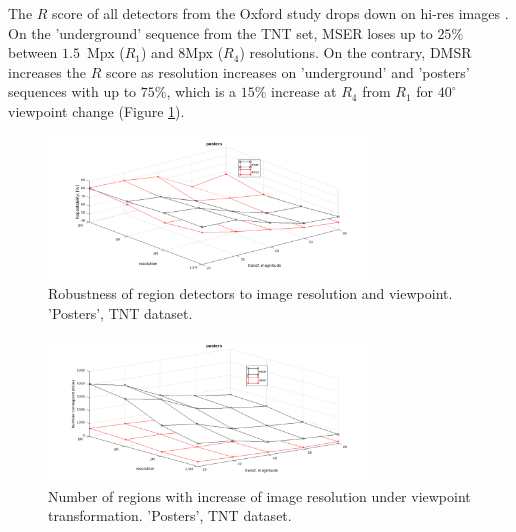 \documentclass{article}
\begin{document}
The $R$ score of all detectors from the Oxford study drops down on hi-res images \cite{CorRos2013}. On the 'underground' sequence from the TNT set, MSER loses up to $25\%$ between $1.5$~Mpx ($R_1$) and $8$Mpx ($R_4$) resolutions. On the contrary, DMSR increases the $R$ score as resolution increases on 'underground' and 'posters' sequences with up to $75\%$, which is a $15\%$ increase at $R_4$ from $R_1$ for $40^{\circ}$ viewpoint change (Figure \ref{fig:tnt}). 

\begin{figure}[htb]

\begin{minipage}[b]{.9\linewidth}
  \centering
  \centerline{\includegraphics[width=8.5cm]{./Figs/posters_rep}}
\end{minipage}
\hfill
\caption{Robustness of region detectors to image resolution and viewpoint. 'Posters', TNT dataset.}
\label{fig:tnt}
\vspace{-0.25cm}
\end{figure}
\begin{figure}[htb]

\begin{minipage}[b]{0.9\linewidth}
  \centering
  \centerline{\includegraphics[width=8.5cm]{./Figs/posters_numreg}}
\end{minipage}
\caption{Number of regions with increase of image resolution under viewpoint transformation. 'Posters', TNT dataset.}
\label{fig:tnt_numreg}
%
\end{figure}
\end{document}
